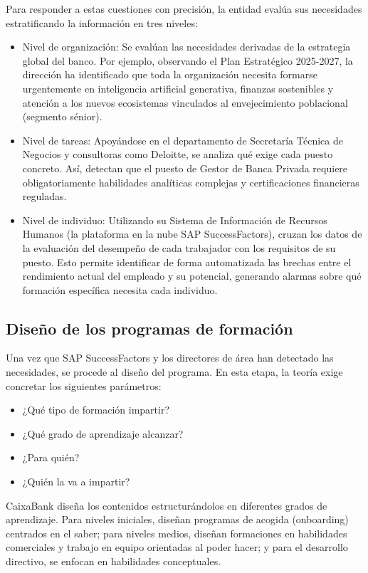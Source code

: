 Para responder a estas cuestiones con precisión, la entidad evalúa sus necesidades estratificando la información en tres niveles:

\begin{itemize}
    \item Nivel de organización: Se evalúan las necesidades derivadas de la estrategia global del banco. Por ejemplo, observando el Plan Estratégico 2025-2027, la dirección ha identificado que toda la organización necesita formarse urgentemente en inteligencia artificial generativa, finanzas sostenibles y atención a los nuevos ecosistemas vinculados al envejecimiento poblacional (segmento sénior).
    \item Nivel de tareas: Apoyándose en el departamento de Secretaría Técnica de Negocios y consultoras como Deloitte, se analiza qué exige cada puesto concreto. Así, detectan que el puesto de Gestor de Banca Privada requiere obligatoriamente habilidades analíticas complejas y certificaciones financieras reguladas.
    \item Nivel de individuo: Utilizando su Sistema de Información de Recursos Humanos (la plataforma en la nube SAP SuccessFactors), cruzan los datos de la evaluación del desempeño de cada trabajador con los requisitos de su puesto. Esto permite identificar de forma automatizada las brechas entre el rendimiento actual del empleado y su potencial, generando alarmas sobre qué formación específica necesita cada individuo.
\end{itemize}

\subsection{Diseño de los programas de formación}

Una vez que SAP SuccessFactors y los directores de área han detectado las necesidades, se procede al diseño del programa. En esta etapa, la teoría exige concretar los siguientes parámetros:

\begin{itemize}
    \item ¿Qué tipo de formación impartir?
    \item ¿Qué grado de aprendizaje alcanzar?
    \item ¿Para quién?
    \item ¿Quién la va a impartir?
\end{itemize}

CaixaBank diseña los contenidos estructurándolos en diferentes grados de aprendizaje. Para niveles iniciales, diseñan programas de acogida (onboarding) centrados en el saber; para niveles medios, diseñan formaciones en habilidades comerciales y trabajo en equipo orientadas al poder hacer; y para el desarrollo directivo, se enfocan en habilidades conceptuales.

